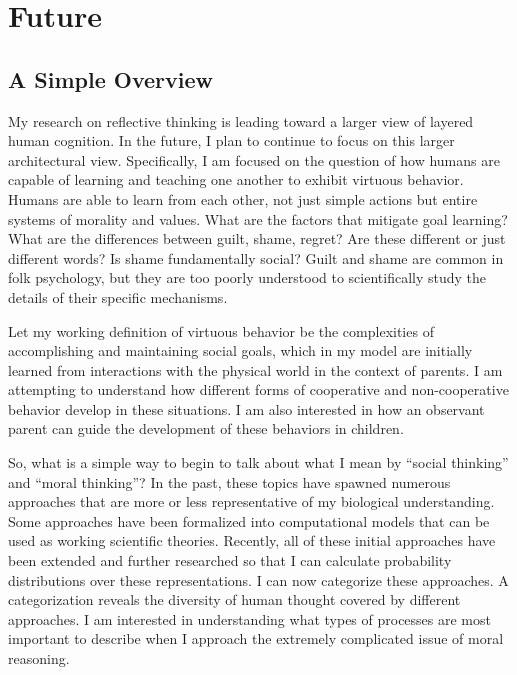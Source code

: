 \chapter{Future}\label{chapter:future}

\section{A Simple Overview}

My research on reflective thinking is leading toward a larger view of
layered human cognition.  In the future, I plan to continue to focus
on this larger architectural view.  Specifically, I am focused on the
question of how humans are capable of learning and teaching one
another to exhibit virtuous behavior.  Humans are able to learn from
each other, not just simple actions but entire systems of morality and
values. What are the factors that mitigate goal learning? What are the
differences between guilt, shame, regret?  Are these different or just
different words? Is shame fundamentally social? Guilt and shame are
common in folk psychology, but they are too poorly understood to
scientifically study the details of their specific mechanisms.

Let my working definition of virtuous behavior be the complexities of
accomplishing and maintaining social goals, which in my model are
initially learned from interactions with the physical world in the
context of parents. I am attempting to understand how different
forms of cooperative and non-cooperative behavior develop in these
situations. I am also interested in how an observant parent can
guide the development of these behaviors in children.

So, what is a simple way to begin to talk about what I mean by
``social thinking'' and ``moral thinking''? In the past, these topics
have spawned numerous approaches that are more or less representative
of my biological understanding. Some approaches have been formalized
into computational models that can be used as working scientific
theories. Recently, all of these initial approaches have been extended
and further researched so that I can calculate probability
distributions over these representations. I can now categorize these
approaches. A categorization reveals the diversity of human thought
covered by different approaches. I am interested in understanding what
types of processes are most important to describe when I approach the
extremely complicated issue of moral reasoning.


